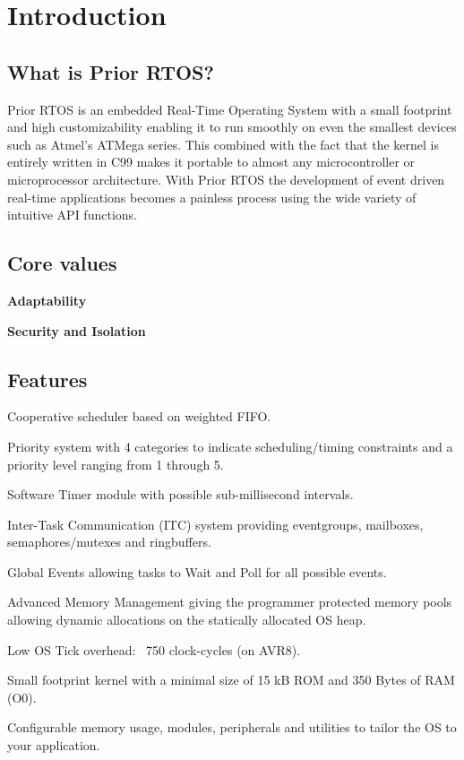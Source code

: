 \chapter{Introduction}

\section{What is Prior RTOS?}

Prior RTOS is an embedded Real-Time Operating System with a small footprint and high customizability enabling it to run smoothly on even the smallest devices such as Atmel’s ATMega series. This combined with the fact that the kernel is entirely written in C99 makes it portable to almost any microcontroller or microprocessor architecture. With Prior RTOS the development of event driven real-time applications becomes a painless process using the wide variety of intuitive API functions.

\section{Core values}

\textbf{Adaptability}

\textbf{Security and Isolation}


\section{Features}
\begin{pditemize}
\item Cooperative scheduler based on weighted FIFO.
\item Priority system with 4 categories to indicate scheduling/timing constraints and a priority level ranging from 1 through 5.
\item Software Timer module with possible sub-millisecond intervals.
\item Inter-Task Communication (ITC) system providing eventgroups, mailboxes, semaphores/mutexes and ringbuffers.
\item Global Events allowing tasks to Wait and Poll for all possible events.
\item Advanced Memory Management giving the programmer protected memory pools allowing dynamic allocations on the statically allocated OS heap.
\item Low OS Tick overhead: ~750 clock-cycles (on AVR8).
\item Small footprint kernel with a minimal size of 15 kB ROM and 350 Bytes of RAM (O0).
\item Configurable memory usage, modules, peripherals and utilities to tailor the OS to your application.
\end{pditemize}
